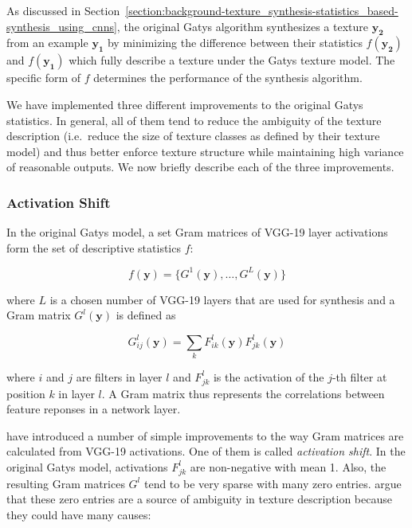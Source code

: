 As discussed in Section~\ref{section:background-texture_synthesis-statistics_based-synthesis_using_cnns}, the original Gatys algorithm synthesizes a texture \(\bm{y_2}\) from an example \(\bm{y_1}\) by minimizing the difference between their statistics \(f(\bm{y_2})\) and \(f(\bm{y_1})\) which fully describe a texture under the Gatys texture model. The specific form of \(f\) determines the performance of the synthesis algorithm.

We have implemented three different improvements to the original Gatys statistics. In general, all of them tend to reduce the ambiguity of the texture description (i.e.~reduce the size of texture classes as defined by their texture model) and thus better enforce texture structure while maintaining high variance of reasonable outputs. We now briefly describe each of the three improvements.

\subsubsection{Activation Shift}
\label{section:methods-texture_model-improvements-activation_shift}

In the original Gatys model, a set Gram matrices of VGG-19 layer activations form the set of descriptive statistics \(f\):

\begin{equation}
    \label{eq:gatys_statistics}
    f(\bm{y}) = \{G^1(\bm{y}), \dots, G^L(\bm{y})\}
\end{equation}

where \(L\) is a chosen number of VGG-19 layers that are used for synthesis and a Gram matrix \(G^l(\bm{y})\) is defined as

\begin{equation}
    \label{eq:gram_style}
    G_{ij}^l(\bm{y}) = \sum_k F_{ik}^l(\bm{y}) F_{jk}^l(\bm{y})
\end{equation}

where \(i\) and \(j\) are filters in layer \(l\) and \(F_{jk}^l\) is the activation of the \(j\)-th filter at position \(k\) in layer \(l\). A Gram matrix thus represents the correlations between feature reponses in a network layer.

\citet{Novak2016} have introduced a number of simple improvements to the way Gram matrices are calculated from VGG-19 activations. One of them is called \textit{activation shift}. In the original Gatys model, activations \(F_{jk}^l\) are non-negative with mean 1. Also, the resulting Gram matrices \(G^l\) tend to be very sparse with many zero entries. \citet{Novak2016} argue that these zero entries are a source of ambiguity in texture description because they could have many causes:

